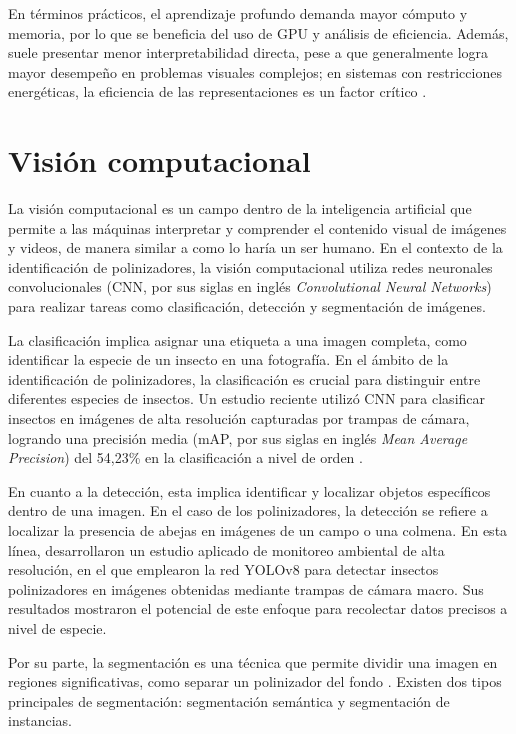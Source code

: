 En términos prácticos, el aprendizaje profundo demanda mayor cómputo y memoria, por lo que se beneficia del uso de GPU y análisis de eficiencia. Además, suele presentar menor interpretabilidad directa, pese a que generalmente logra mayor desempeño en problemas visuales complejos; en sistemas con restricciones energéticas, la eficiencia de las representaciones es un factor crítico \parencite{staka2025cpugpu,chen2024tradeoff}.


\section{Visión computacional}

La visión computacional es un campo dentro de la inteligencia artificial que permite a las máquinas interpretar y comprender el contenido visual de imágenes y videos, de manera similar a como lo haría un ser humano. En el contexto de la identificación de polinizadores, la visión computacional utiliza redes neuronales convolucionales (CNN, por sus siglas en inglés \textit{Convolutional Neural Networks}) para realizar tareas como clasificación, detección y segmentación de imágenes. 

La clasificación implica asignar una etiqueta a una imagen completa, como identificar la especie de un insecto en una fotografía. En el ámbito de la identificación de polinizadores, la clasificación es crucial para distinguir entre diferentes especies de insectos. Un estudio reciente utilizó CNN para clasificar insectos en imágenes de alta resolución capturadas por trampas de cámara, logrando una precisión media (mAP, por sus siglas en inglés \textit{Mean Average Precision}) del 54,23\% en la clasificación a nivel de orden \parencite{sadoun2024camera}. 

En cuanto a la detección, esta implica identificar y localizar objetos específicos dentro de una imagen. En el caso de los polinizadores, la detección se refiere a localizar la presencia de abejas en imágenes de un campo o una colmena. En esta línea, \parencite{sadoun2024camera} desarrollaron un estudio aplicado de monitoreo ambiental de alta resolución, en el que emplearon la red YOLOv8 para detectar insectos polinizadores en imágenes obtenidas mediante trampas de cámara macro. Sus resultados mostraron el potencial de este enfoque para recolectar datos precisos a nivel de especie.

Por su parte, la segmentación es una técnica que permite dividir una imagen en regiones significativas, como separar un polinizador del fondo \parencite{indu2023leaf}. Existen dos tipos principales de segmentación: segmentación semántica y segmentación de instancias. 

